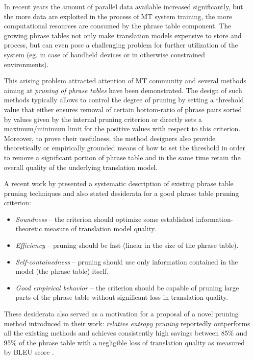 In recent years the amount of parallel data available increased significantly,
but the more data are exploited in the process of MT system training,
the more computational resources are consumed by the phrase table component.
The growing phrase tables not only make translation models expensive to store and process,
but can even pose a challenging problem for further utilization of the system
(eg. in case of handheld devices or in otherwise constrained environments).

This arising problem attracted attention of MT community and several methods
aiming at \emph{pruning of phrase tables} have been demonstrated.
The design of such methods typically allows to control the degree of pruning by setting
a threshold value that either ensures removal of certain bottom-ratio of phrase pairs
sorted by values given by the internal pruning criterion or directly sets
a maximum/minimum limit for the positive values with respect to this criterion.
Moreover, to prove their usefulness, the method designers also provide theoretically
or empirically grounded means of how to set the threshold in order to remove
a significant portion of phrase table and in the same time retain the overall quality
of the underlying translation model.

A recent work by \citet{zens:systcomp} presented a systematic description of existing
phrase table pruning techniques and also stated desiderata for a good phrase table pruning
criterion:
\begin{itemize}
  \item \emph{Soundness} -- the criterion should optimize some established
    information-theoretic measure of translation model quality.
  \item \emph{Efficiency} -- pruning should be fast (linear in the size of the phrase table).
  \item \emph{Self-containedness} -- pruning should use only information contained in the model
  (the phrase table) itself.
  \item \emph{Good empirical behavior} -- the criterion should be capable of pruning large parts
    of the phrase table without significant loss in translation quality.
\end{itemize}

These desiderata also served as a motivation for a proposal of a novel pruning method introduced
in their work: \emph{relative entropy pruning} reportedly outperforms all the existing methods and 
achieves consistently high savings between 85\% and 95\% of the phrase table with a negligible loss
of translation quality as measured by BLEU score \citep{papineni:bleu}.

